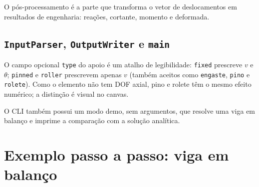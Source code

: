 \documentclass[12pt,a4paper]{article}
\begin{document}






O pós-processamento é a parte que transforma o vetor de deslocamentos em resultados de engenharia: reações, cortante, momento e deformada.

\subsection{\texttt{InputParser}, \texttt{OutputWriter} e \texttt{main}}



O campo opcional \texttt{type} do apoio é um atalho de legibilidade: \texttt{fixed} prescreve $v$ e $\theta$; \texttt{pinned} e \texttt{roller} prescrevem apenas $v$ (também aceitos como \texttt{engaste}, \texttt{pino} e \texttt{rolete}). Como o elemento não tem DOF axial, pino e rolete têm o mesmo efeito numérico; a distinção é visual no canvas.





O CLI também possui um modo demo, sem argumentos, que resolve uma viga em balanço e imprime a comparação com a solução analítica.

\section{Exemplo passo a passo: viga em balanço}
\label{sec:exemplo}
\end{document}
